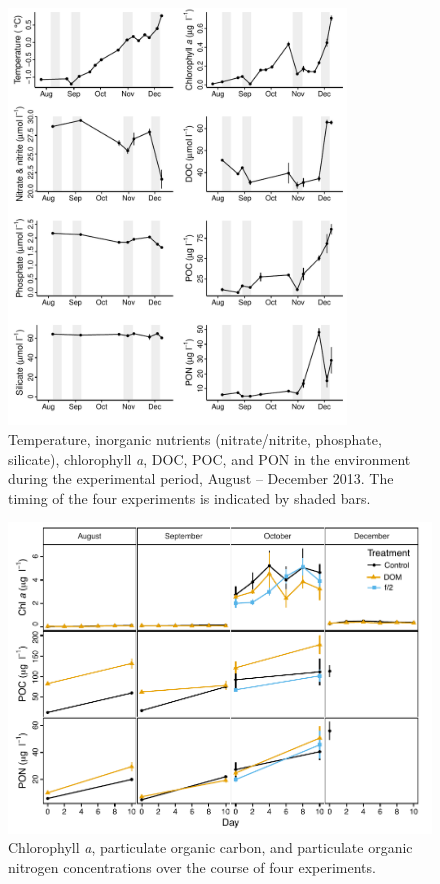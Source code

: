 \begin{figure}[htbp] 
\centering 
\includegraphics[width=0.8\textwidth]{Chapter_4_DOM/Figures/Supplemental_Figure_1_SWI_data}
\caption[Environmental conditions during the experimental period, August-December 2013.]{Temperature, inorganic nutrients (nitrate/nitrite, phosphate, silicate), chlorophyll \emph{a}, DOC, POC, and PON in the environment during the experimental period, August – December 2013. The timing of the four experiments is indicated by shaded bars.} 
\label{fig:ch3:swi} 
\end{figure}

\begin{figure}[ht!] 
\centering 
\includegraphics[width=\textwidth]{Chapter_4_DOM/Figures/Supplemental_Figure_2_Chla_POC_PON}
\caption[Chlorophyll \emph{a}, particulate organic carbon, and particulate organic nitrogen concentrations over the course of four experiments.]{Chlorophyll \emph{a}, particulate organic carbon, and particulate organic nitrogen concentrations over the course of four experiments.
} 
\label{fig:ch3:chla_poc_pon} 
\end{figure}

